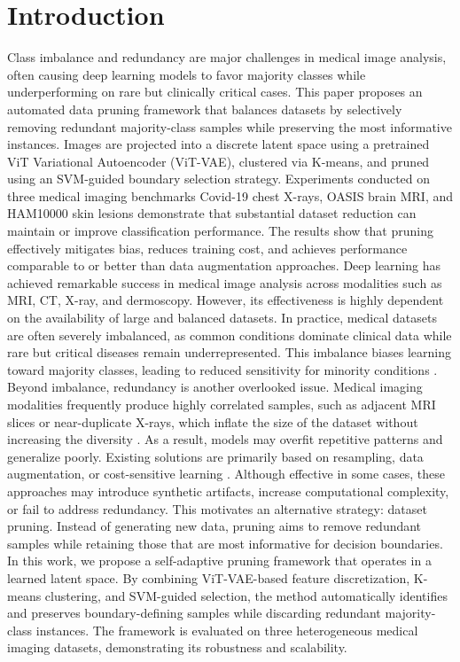 \documentclass[final,5p,times,twocolumn,authoryear]{elsarticle}
\begin{document}
\section{Introduction}
Class imbalance and redundancy are major challenges in medical image analysis, often causing deep learning models to favor majority classes while underperforming on rare but clinically critical cases. This paper proposes an automated data pruning framework that balances datasets by selectively removing redundant majority-class samples while preserving the most informative instances.
Images are projected into a discrete latent space using a pretrained ViT Variational Autoencoder (ViT-VAE), clustered via K-means, and pruned using an SVM-guided boundary selection strategy. Experiments conducted on three medical imaging benchmarks Covid-19 chest X-rays, OASIS brain MRI, and HAM10000 skin lesions demonstrate that substantial dataset reduction can maintain or improve classification performance. The results show that pruning effectively mitigates bias, reduces training cost, and achieves performance comparable to or better than data augmentation approaches.
Deep learning has achieved remarkable success in medical image analysis across modalities such as MRI, CT, X-ray, and dermoscopy. However, its effectiveness is highly dependent on the availability of large and balanced datasets. In practice, medical datasets are often severely imbalanced, as common conditions dominate clinical data while rare but critical diseases remain underrepresented. This imbalance biases learning toward majority classes, leading to reduced sensitivity for minority conditions \cite{ref1}.
Beyond imbalance, redundancy is another overlooked issue. Medical imaging modalities frequently produce highly correlated samples, such as adjacent MRI slices or near-duplicate X-rays, which inflate the size of the dataset without increasing the diversity \cite{ref3, ref4}. As a result, models may overfit repetitive patterns and generalize poorly.
Existing solutions are primarily based on resampling, data augmentation, or cost-sensitive learning \cite{ref2}. Although effective in some cases, these approaches may introduce synthetic artifacts, increase computational complexity, or fail to address redundancy. This motivates an alternative strategy: dataset pruning. Instead of generating new data, pruning aims to remove redundant samples while retaining those that are most informative for decision boundaries.
In this work, we propose a self-adaptive pruning framework that operates in a learned latent space. By combining ViT-VAE-based feature discretization, K-means clustering, and SVM-guided selection, the method automatically identifies and preserves boundary-defining samples while discarding redundant majority-class instances. The framework is evaluated on three heterogeneous medical imaging datasets, demonstrating its robustness and scalability.
\end{document}

